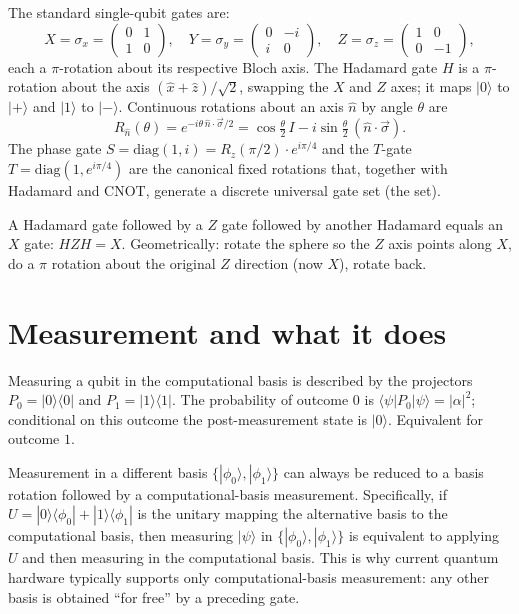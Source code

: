 The standard single-qubit gates are:
\[
  X = \sigma_x = \begin{pmatrix}0&1\\1&0\end{pmatrix}, \quad
  Y = \sigma_y = \begin{pmatrix}0&-i\\i&0\end{pmatrix}, \quad
  Z = \sigma_z = \begin{pmatrix}1&0\\0&-1\end{pmatrix},
\]
each a $\pi$-rotation about its respective Bloch axis. The Hadamard gate $H$ is a $\pi$-rotation about the axis $(\hat x+\hat z)/\sqrt 2$, swapping the $X$ and $Z$ axes; it maps $|0\rangle$ to $|+\rangle$ and $|1\rangle$ to $|-\rangle$. Continuous rotations about an axis $\hat n$ by angle $\theta$ are
\[
  R_{\hat n}(\theta) = e^{-i\theta\,\hat n\cdot\vec\sigma/2} = \cos\tfrac{\theta}{2}\,I - i\sin\tfrac{\theta}{2}\,(\hat n\cdot\vec\sigma).
\]
The phase gate $S = \mathrm{diag}(1,i) = R_z(\pi/2)\cdot e^{i\pi/4}$ and the $T$-gate $T = \mathrm{diag}(1, e^{i\pi/4})$ are the canonical fixed rotations that, together with Hadamard and CNOT, generate a discrete universal gate set (the  set).

\begin{example}
A Hadamard gate followed by a $Z$ gate followed by another Hadamard equals an $X$ gate: $HZH = X$. Geometrically: rotate the sphere so the $Z$ axis points along $X$, do a $\pi$ rotation about the original $Z$ direction (now $X$), rotate back.
\end{example}

\section{Measurement and what it does}

Measuring a qubit in the computational basis is described by the projectors $P_0 = |0\rangle\langle 0|$ and $P_1 = |1\rangle\langle 1|$. The probability of outcome $0$ is $\langle\psi|P_0|\psi\rangle = |\alpha|^2$; conditional on this outcome the post-measurement state is $|0\rangle$. Equivalent for outcome $1$.

Measurement in a different basis $\{|\phi_0\rangle,|\phi_1\rangle\}$ can always be reduced to a basis rotation followed by a computational-basis measurement. Specifically, if $U = |0\rangle\langle\phi_0| + |1\rangle\langle\phi_1|$ is the unitary mapping the alternative basis to the computational basis, then measuring $|\psi\rangle$ in $\{|\phi_0\rangle,|\phi_1\rangle\}$ is equivalent to applying $U$ and then measuring in the computational basis. This is why current quantum hardware typically supports only computational-basis measurement: any other basis is obtained ``for free'' by a preceding gate.

